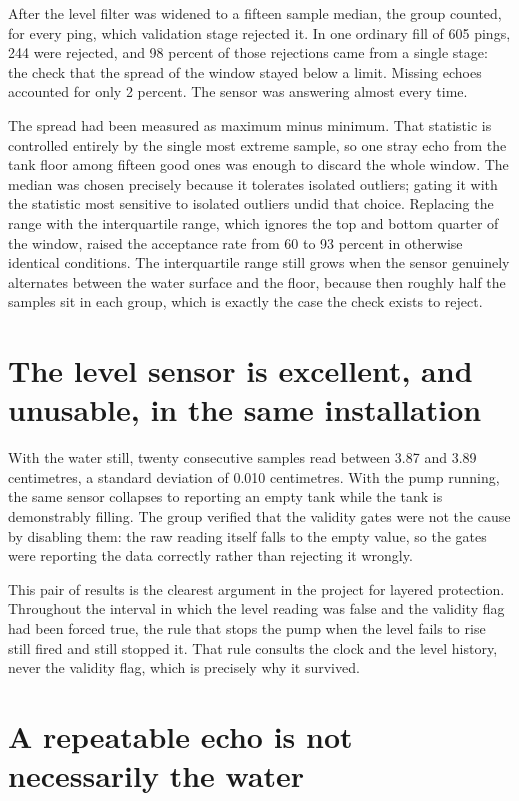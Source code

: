 After the level filter was widened to a fifteen sample median, the group counted, for every ping, which validation stage rejected it. In one ordinary fill of 605 pings, 244 were rejected, and 98 percent of those rejections came from a single stage: the check that the spread of the window stayed below a limit. Missing echoes accounted for only 2 percent. The sensor was answering almost every time.

The spread had been measured as maximum minus minimum. That statistic is controlled entirely by the single most extreme sample, so one stray echo from the tank floor among fifteen good ones was enough to discard the whole window. The median was chosen precisely because it tolerates isolated outliers; gating it with the statistic most sensitive to isolated outliers undid that choice. Replacing the range with the interquartile range, which ignores the top and bottom quarter of the window, raised the acceptance rate from 60 to 93 percent in otherwise identical conditions. The interquartile range still grows when the sensor genuinely alternates between the water surface and the floor, because then roughly half the samples sit in each group, which is exactly the case the check exists to reject.

\section{The level sensor is excellent, and unusable, in the same installation}

With the water still, twenty consecutive samples read between 3.87 and 3.89 centimetres, a standard deviation of 0.010 centimetres. With the pump running, the same sensor collapses to reporting an empty tank while the tank is demonstrably filling. The group verified that the validity gates were not the cause by disabling them: the raw reading itself falls to the empty value, so the gates were reporting the data correctly rather than rejecting it wrongly.

This pair of results is the clearest argument in the project for layered protection. Throughout the interval in which the level reading was false and the validity flag had been forced true, the rule that stops the pump when the level fails to rise still fired and still stopped it. That rule consults the clock and the level history, never the validity flag, which is precisely why it survived.

\section{A repeatable echo is not necessarily the water}

